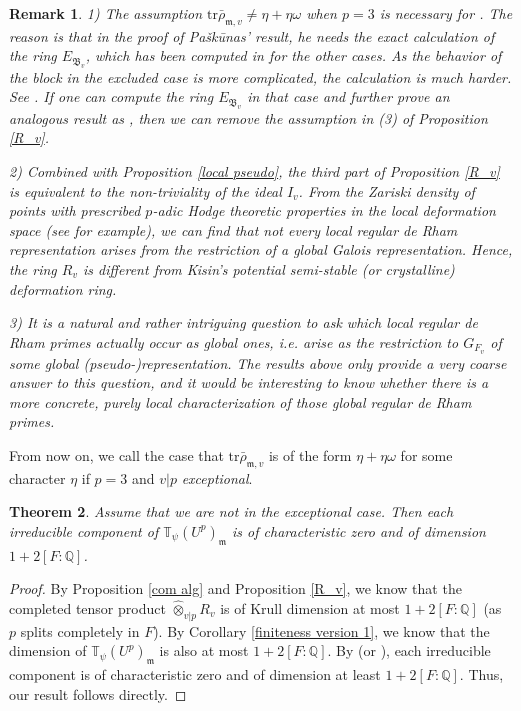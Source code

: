 \documentclass[a4paper, 12pt]{amsart}
\newtheorem{thm}{Theorem}[subsection]
\newtheorem{rem}[thm]{\bf Remark}
\newcommand{\Q}{\mathbb{Q}}
\newcommand{\T}{\mathbb{T}}
\newcommand{\tr}{\mathrm{tr}}
\newcommand{\kB}{\mathfrak{B}}
\newcommand{\km}{\mathfrak{m}}
\begin{document}
    \begin{rem}\label{rem}
    	1) The assumption $\tr \bar{\rho}_{\km, v} \ne \eta + \eta\omega$ when $p=3$ is necessary for \cite[Corollary 5.13]{Paskunas_2021}. The reason is that in the proof of Pašk\=unas' result, he needs the exact calculation of the ring $E_{\kB_v}$, which has been computed in \cite[Section 6-10]{Pa_k_nas_2013} for the other cases. As the behavior of the block in the excluded case is more complicated, the calculation is much harder. See \cite[Subsection 1.2]{Pa_k_nas_2021}. If one can compute the ring $E_{\kB_v}$ in that case and further prove an analogous result as \cite[Corollary 5.13]{Paskunas_2021}, then we can remove the assumption in (3) of Proposition \ref{R_v}.
    	
    	2) Combined with Proposition \ref{local pseudo}, the third part of Proposition \ref{R_v} is equivalent to the non-triviality of the ideal $I_v$. From the Zariski density of points with prescribed $p$-adic Hodge theoretic properties in the local deformation space (see \cite[Section 6]{B_ckle_2023} for example), we can find that not every local regular de Rham representation arises from the restriction of a global Galois representation. Hence, the ring $R_v$ is different from Kisin's potential semi-stable (or crystalline) deformation ring.
    	
    	3) It is a natural and rather intriguing question to ask which local regular de Rham primes actually occur as global ones, i.e. arise as the restriction to $G_{F_v}$ of some global (pseudo-)representation. The results above only provide a very coarse answer to this question, and it would be interesting to know whether there is a more concrete, purely local characterization of those global regular de Rham primes.
    \end{rem}
    
    From now on, we call the case that $\tr \bar{\rho}_{\km, v} $ is of the form $\eta + \eta\omega$ for some character $\eta$ if $p=3$ and $v|p$ \textit{exceptional}.
    
    \begin{thm}\label{dim of T}
    	Assume that we are not in the exceptional case. Then each irreducible component of $ \T_{\psi}(U^p)_\km$ is of characteristic zero and of dimension $1+2[F:\Q]$.
    \end{thm}
    
    \begin{proof}
    	By Proposition \ref{com alg} and Proposition \ref{R_v}, we know that the completed tensor product $\widehat{\otimes}_{v|p} R_v$ is of Krull dimension at most $1+2[F: \Q]$ (as $p$ splits completely in $F$). By Corollary \ref{finiteness version 1}, we know that the dimension of  $ \T_{\psi}(U^p)_\km$ is also at most $1+2[F: \Q]$. By \cite[Theorem 3.6.1]{pan2022fontaine} (or \cite[Corollary 3.3.10]{Zhang:2024aa}), each irreducible component is of characteristic zero and of dimension at least  $1+2[F: \Q]$. Thus, our result follows directly.
    \end{proof}
    
\end{document}
